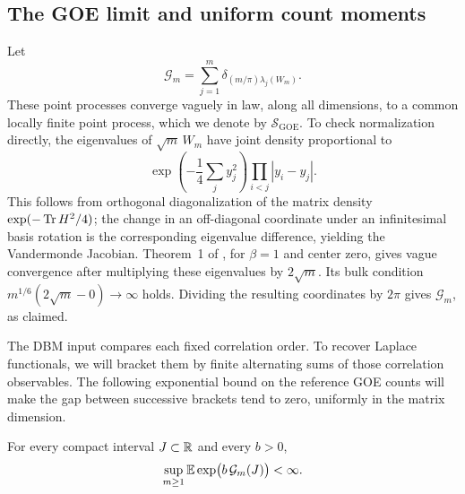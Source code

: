\subsection{The GOE limit and uniform count moments}

Let
\[
 \mathcal G_m=\sum_{j=1}^m
       \delta_{(m/\pi)\lambda_j(W_m)}.
\]
These point processes converge vaguely in law, along all dimensions,
to a common locally finite point process, which we denote by
\(\mathcal S_{\mathrm{GOE}}\). To check normalization directly,
the eigenvalues of \(\sqrt m\,W_m\) have joint density proportional to
\[
 \exp\left(-\frac14\sum_j y_j^2\right)
       \prod_{i<j}|y_i-y_j|.
\]
This follows from orthogonal diagonalization of the matrix density
\(\exp(-\operatorname{Tr} H^2/4)\); the change in an off-diagonal coordinate under
an infinitesimal basis rotation is the corresponding eigenvalue
difference, yielding the Vandermonde Jacobian.
Theorem~1 of \citet{ValkoVirag}, for \(\beta=1\) and center zero,
gives vague convergence after multiplying these eigenvalues by
\(2\sqrt m\). Its bulk condition
\(m^{1/6}(2\sqrt m-0)\to\infty\) holds. Dividing the resulting
coordinates by \(2\pi\) gives \(\mathcal G_m\), as claimed.

The DBM input compares each fixed correlation order. To recover Laplace
functionals, we will bracket them by finite alternating sums of those
correlation observables. The following exponential bound on the reference
GOE counts will make the gap between successive brackets tend to zero,
uniformly in the matrix dimension.

\begin{lemma}
\label{lem:goe-counts}
For every compact interval \(J\subset\mathbb R\) and every \(b>0\),
\[
 \sup_{m\ge1}\mathbb E\exp\bigl(b\,\mathcal G_m(J)\bigr)<\infty.
\]
\end{lemma}

